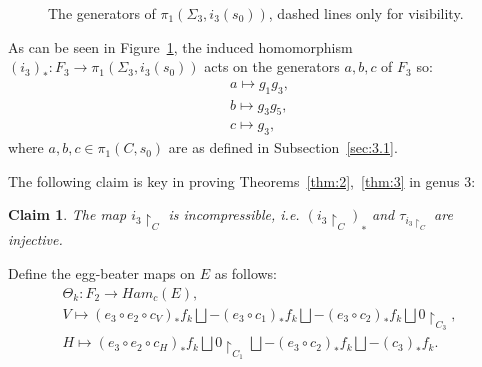 \documentclass[11pt]{article}
\newenvironment{myequation}
    {
        \begin{equation*}
        \begin{gathered}
    }
    { 
        \end{gathered} 
        \end{equation*}
    }
\newtheorem{claim}[theorem]{Claim}
\begin{document}
\begin{figure}[!ht]
\begin{minipage}{.5\textwidth}
{}
                \caption{The generators of $\pi_1(\Sigma_3,i_3(s_0))$, dashed lines only for visibility.}
                \label{fig:gens_gen_3}
            \end{minipage}
        \end{figure}
        
        As can be seen in Figure~\ref{fig:gens_gen_3}, the induced homomorphism $(i_3)_*: F_3 \to \pi_1(\Sigma_3,i_3(s_0))$ acts on the generators $a,b,c$ of $F_3$ so:
        \begin{myequation}
            a \mapsto g_1 g_3 ,\\
            b \mapsto g_3 g_5 ,\\
            c \mapsto g_3 ,
        \end{myequation}
        where $a,b,c \in \pi_1(C,s_0)$ are as defined in Subsection~\ref{sec:3.1}.
        
        The following claim is key in proving Theorems~\ref{thm:2},~\ref{thm:3} in genus 3:
        
        \begin{claim}
        \label{cl:incompressible}
            The map $i_3 \restriction_C$ is incompressible, i.e. $(i_3 \restriction_C)_*$ and $\tau_{i_3 \restriction_C}$ are injective.
        \end{claim}
        
        Define the egg-beater maps on $E$ as follows:
        \begin{myequation}
            \Theta_k: F_2 \to Ham_c(E) ,\\
            V \mapsto (e_3 \circ e_2 \circ c_V)_* f_k \bigsqcup -(e_3 \circ c_1)_* f_k \bigsqcup -(e_3 \circ c_2)_* f_k \bigsqcup 0 \restriction_{C_3} ,\\
            H \mapsto (e_3 \circ e_2 \circ c_H)_* f_k \bigsqcup 0 \restriction_{C_1} \bigsqcup -(e_3 \circ c_2)_* f_k \bigsqcup -(c_3)_* f_k .
        \end{myequation}
        
\end{document}
